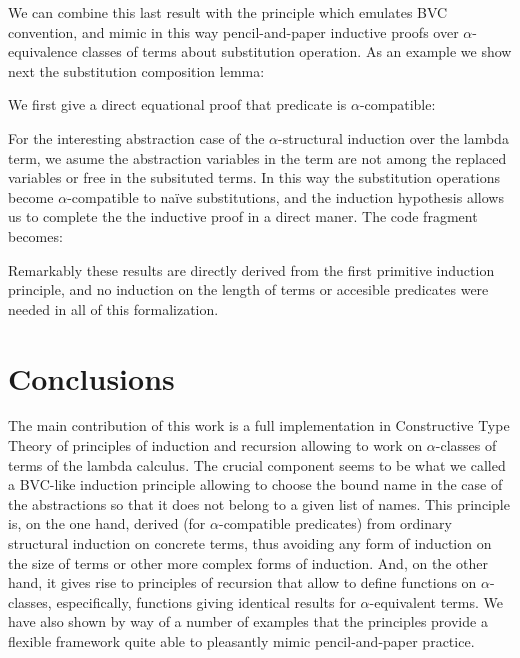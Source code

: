 \documentclass{entcs}
\newcommand{\alp}{\ensuremath{\alpha}}
\begin{document}
 \hspace{5px}

We can combine this last result with the  principle which emulates BVC convention, and mimic in this way pencil-and-paper inductive proofs over \alp-equivalence classes of terms about substitution operation. As an example we show next the substitution composition lemma:

 \hspace{5px}

\noindent We first give a direct equational proof that  predicate is \alp-compatible:

 \hspace{5px}

\noindent For the interesting abstraction case of the \alp-structural induction over the lambda term, we asume the abstraction variables in the term are not among the replaced variables or free in the subsituted terms. In this way the substitution operations become \alp-compatible to na\"ive substitutions, and the induction hypothesis allows us to complete the the inductive proof in a direct maner. The code fragment becomes:
 
 \hspace{5px}

Remarkably these results are directly derived from the first primitive induction principle, and no induction on the length of terms or accesible predicates were needed in all of this formalization.

\section{Conclusions}
The main contribution of this work is a full implementation in Constructive Type Theory of principles of induction and recursion allowing to work on $\alpha$-classes of terms of the lambda calculus. The crucial component seems to be what we called a BVC-like induction principle allowing to choose the bound name in the case of the abstractions so that it does not belong to a given list of names. This principle is, on the one hand, derived (for $\alpha$-compatible predicates) from ordinary structural induction on concrete terms, thus avoiding any form of induction on the size of terms or other more complex forms of induction. And, on the other hand, it gives rise to principles of recursion that allow to define functions on $\alpha$-classes, especifically, functions giving identical results for $\alpha$-equivalent terms. We have also shown by way of a number of examples that the principles provide a flexible framework quite able to pleasantly mimic pencil-and-paper practice.
\end{document}
